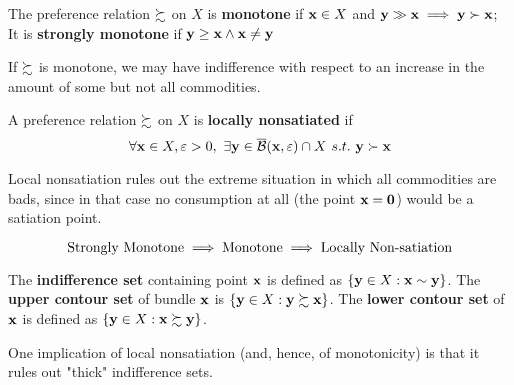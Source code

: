 \documentclass{article}
\begin{document}
 			\begin{definition}[3.B.2]
 				The preference relation $\succsim$ on $X$ is \textbf{monotone} if $\textbf{x} \in X$ and $\textbf{y} \gg \textbf{x} \implies \textbf{y} \succ \textbf{x}$; It is \textbf{strongly monotone} if $\textbf{y} \geq \textbf{x} \land \textbf{x} \neq \textbf{y}$
 			\end{definition}
 			
 			\begin{remark}
 				If $\succsim$ is monotone, we may have indifference with respect to an increase in the amount of some but not all commodities.
 			\end{remark}
 			
 			\begin{definition}[3.B.3]
 				A preference relation $\succsim$ on $X$ is \textbf{locally nonsatiated} if
 				\begin{equation}
 					\forall \textbf{x} \in X, \varepsilon > 0,\ \exists \textbf{y} \in \overline{\mathcal{{B}}}(\textbf{x}, \varepsilon) \cap X\ s.t.\ \textbf{y} \succ \textbf{x}
 				\end{equation}
 			\end{definition}
 			
 			\begin{remark}
 				Local nonsatiation rules out the extreme situation in which all commodities are bads, since in that case no consumption at all (the point $\textbf{x} = \textbf{0}$) would be a satiation point.
 			\end{remark}
 			
 			\begin{proposition}
 				\begin{equation}
 					\text{{Strongly Monotone}} \implies \text{{Monotone}} \implies \text{{Locally Non-satiation}}
 				\end{equation}
 			\end{proposition}
 			
 			\begin{definition}
 				The \textbf{indifference set} containing point $\textbf{x}$ is defined as $\{\textbf{y} \in X: \textbf{x} \sim \textbf{y} \}$. The \textbf{upper contour set} of bundle $\textbf{x}$ is $\{\textbf{y} \in X: \textbf{y} \succsim \textbf{x}\}$. The \textbf{lower contour set} of $\textbf{x}$ is defined as $\{\textbf{y} \in X: \textbf{x} \succsim \textbf{y}\}$.
 			\end{definition}
 			
 			\begin{remark}
 				One implication of local nonsatiation (and, hence, of monotonicity) is that it rules out "thick" indifference sets.
 			\end{remark}
 			
\end{document}
